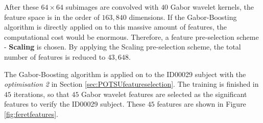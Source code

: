 After these $64\times 64$ subimages are convolved with $40$ Gabor wavelet kernels, the feature space is in the order of $163,840$ dimensions. If the Gabor-Boosting algorithm is directly applied on to this massive amount of features, the computational cost would be enormous. Therefore, a feature pre-selection scheme - \textbf{Scaling} is chosen. By applying the Scaling pre-selection scheme, the total number of features is reduced to $43,648$. 

The Gabor-Boosting algorithm is applied on to the ID00029 subject with the \textit{optimisation 2} in \mbox{Section} \ref{sec:POTSUfeatureselection}. The training is finished in $45$ iterations, so that $45$ Gabor wavelet features are selected as the significant features to verify the ID00029 subject. These $45$ features are shown in \mbox{Figure} \ref{fig:feretfeatures}. 
\begin{figure}[ht]
\begin{center}

\end{center}
\end{figure}
